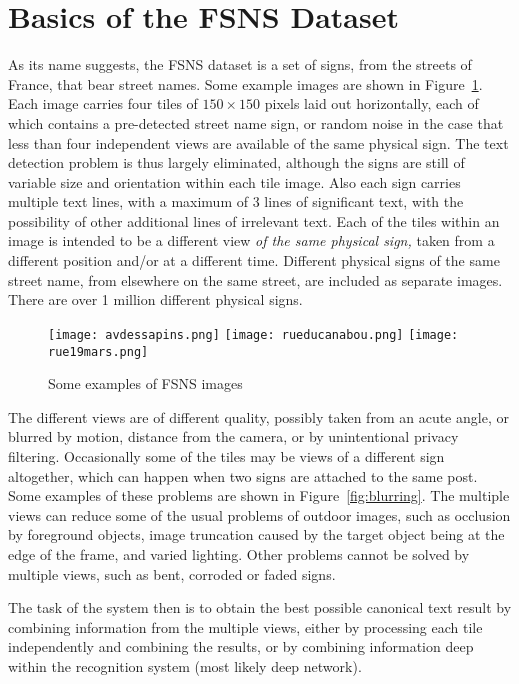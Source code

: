\documentclass[runningheads]{llncs}
\begin{document}
\section{Basics of the FSNS Dataset}
As its name suggests, the FSNS dataset is a set of signs, from the streets of France, that bear street
 names. Some example images are shown in Figure~\ref{fig:samples}. Each image carries four tiles of
 $150 \times 150$ pixels laid out horizontally, each of which contains a pre-detected street name sign,
 or random noise in the case that less than four independent views are available of the same physical
 sign. The text detection problem is thus largely eliminated, although the signs are still of variable
 size and orientation within each tile image. Also each sign carries multiple text lines, with a maximum
 of 3 lines of significant text, with the possibility of other additional lines of irrelevant text. Each
 of the tiles within an image is intended to be a different view {\it of the same physical sign,} taken
 from a different position and/or at a different time. Different physical signs of the same street name,
 from elsewhere on the same street, are included as separate images. There are over 1 million different
 physical signs.

\begin{figure}
\centering
\texttt{[image: avdessapins.png]}
\texttt{[image: rueducanabou.png]}
\texttt{[image: rue19mars.png]}
\caption{Some examples of FSNS images}
\label{fig:samples}
\end{figure}

The different views are of different quality, possibly taken from an acute angle, or blurred by motion,
 distance from the camera, or by unintentional privacy filtering. Occasionally some of the tiles may
 be views of a different sign altogether, which can happen when two signs are attached to the same post.
 Some examples of these problems are shown in Figure~\ref{fig:blurring}. The multiple views can reduce
 some of the usual problems of outdoor images, such as occlusion by foreground objects, image truncation
 caused by the target object being at the edge of the frame, and varied lighting. Other problems cannot
 be solved by multiple views, such as bent, corroded or faded signs.

The task of the system then is to obtain the best possible canonical text result by combining information from the multiple views, either by processing each tile independently and combining the results, or by combining information deep within the recognition system (most likely deep network).
\end{document}
